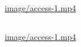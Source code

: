 \documentclass[
  letterpaper,
  DIV=11,
  numbers=noendperiod]{scrreprt}
\begin{document}
\part{}

\hypertarget{section-4}{%
\chapter{}\label{section-4}}

\part{}

\hypertarget{section-6}{%
\chapter{}\label{section-6}}

\part{}

\url{image/access-1.mp4}

\hypertarget{section-8}{%
\chapter{}\label{section-8}}

\url{image/access-1.mp4}
\end{document}
